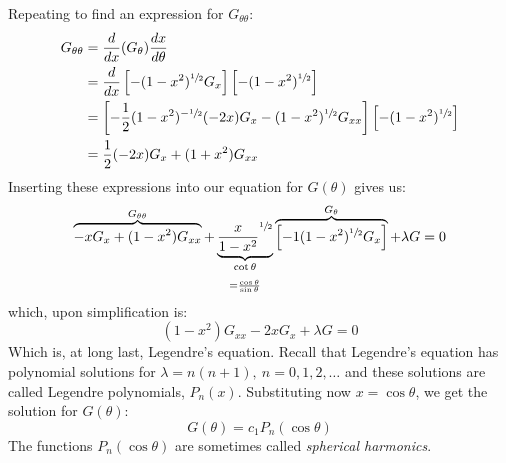 Repeating to find an expression for $G_{\theta\theta}$:
\begin{align*}
G_{\theta \theta} &= \frac{d}{dx}(G_{\theta})\frac{dx}{d\theta} \\
&=\frac{d}{dx}\left[-(1-x^2)^{\sfrac{1}{2}}G_x\right]\left[-(1-x^2)^{\sfrac{1}{2}}\right] \\
&=\left[-\frac{1}{2}(1-x^2)^{-\sfrac{1}{2}}(-2x)G_x - (1-x^2)^{\sfrac{1}{2}}G_{xx}\right]\left[-(1-x^2)^{\sfrac{1}{2}}\right] \\
&=\frac{1}{2}(-2x)G_x + (1+x^2)G_{xx}
\end{align*}
Inserting these expressions into our equation for $G(\theta)$ gives us:
\begin{equation*}
\overbrace{-xG_{x}+(1-x^2)G_{xx}}^{G_{\theta \theta}} + \underbrace{\frac{x}{1-x^2}^{\sfrac{1}{2}}}_{\substack{\cot{\theta} \\ \\ = \frac{\cos{\theta}}{\sin{\theta}}}}\overbrace{\left[-1(1-x^2)^{\sfrac{1}{2}}G_x \right]}^{G_{\theta}} + \lambda G = 0
\end{equation*}
which, upon simplification is:
\begin{equation*}
(1-x^2)G_{xx} - 2xG_x + \lambda G = 0
\end{equation*}
Which is, at long last, Legendre's equation.  Recall that Legendre's equation has polynomial solutions for $\lambda = n(n+1), \ n=0,1,2,\dots$ and these solutions are called Legendre polynomials, $P_n(x)$. Substituting now $x = \cos{\theta}$, we get the solution for $G(\theta)$:
\begin{equation*}
G(\theta) = c_1P_n(\cos{\theta})
\end{equation*}
The functions $P_n(\cos{\theta})$ are sometimes called \emph{spherical harmonics}.

